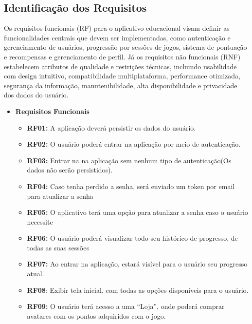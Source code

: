 \subsection{Identificação dos Requisitos}


Os requisitos funcionais (RF) para o aplicativo educacional visam definir as funcionalidades centrais que devem ser implementadas, como autenticação e gerenciamento de usuários, progressão por sessões de jogos, sistema de pontuação e recompensas e gerenciamento de perfil. 
Já os requisitos não funcionais (RNF) estabelecem atributos de qualidade e restrições técnicas, incluindo usabilidade com design intuitivo, compatibilidade multiplataforma, performance otimizada, segurança da informação, manutenibilidade, alta disponibilidade e privacidade dos dados do usuário.

\begin{itemize}
    \item \textbf{Requisitos Funcionais}
    \begin{itemize}
        \item \textbf{RF01:} A aplicação deverá persistir os dados do usuário.

        \item \textbf{RF02:} O usuário poderá entrar na aplicação por meio de autenticação.

        \item \textbf{RF03:} Entrar na na aplicação sem nenhum tipo de autenticação(Os dados não serão persistidos).

        \item \textbf{RF04:} Caso tenha perdido a senha, será enviado um token por email para atualizar a senha

        \item \textbf{RF05:} O aplicativo terá uma opção para atualizar a senha caso o usuário necessite

        \item \textbf{RF06:} O usuário poderá visualizar todo seu histórico de progresso, de todas as suas sessões

        \item \textbf{RF07:} Ao entrar na aplicação, estará visível para o usuário seu progresso atual.

        \item \textbf{RF08}: Exibir tela inicial, com todas as opções disponíveis para o usuário.

        \item \textbf{RF09:} O usuário terá acesso a uma “Loja”, onde poderá comprar avatares com os pontos adquiridos com o jogo.


\end{itemize}
\end{itemize}
